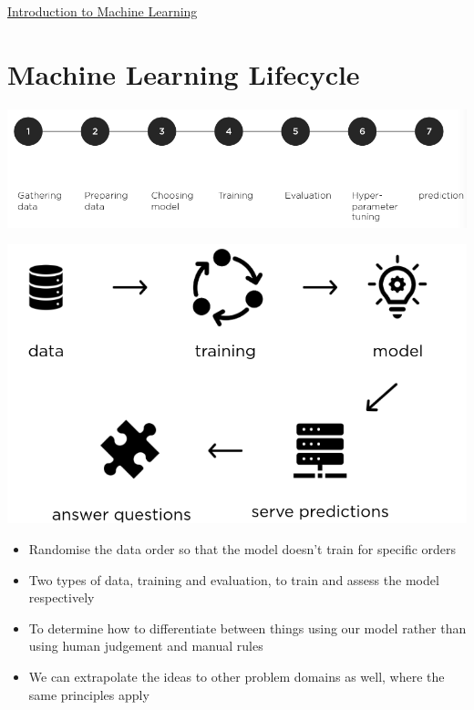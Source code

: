 \documentclass{article}[18pt]
\begin{document}
\begin{center}
\underline{\huge Introduction to Machine Learning}
\end{center}
\section{Machine Learning Lifecycle}
\begin{center}
	\includegraphics[scale=0.7]{"Machine Learning Lifecycle"}
\end{center}
\begin{center}
	\includegraphics[scale=0.7]{"Machine Learning Lifecycle1"}
\end{center}
\begin{itemize}
	\item Randomise the data order so that the model doesn't train for specific orders
	\item Two types of data, training and evaluation, to train and assess the model respectively 
	\item To determine how to differentiate between things using our model rather than using human judgement and manual rules
	\item We can extrapolate the ideas to other problem domains as well, where the same principles apply
\end{itemize}
\end{document}
